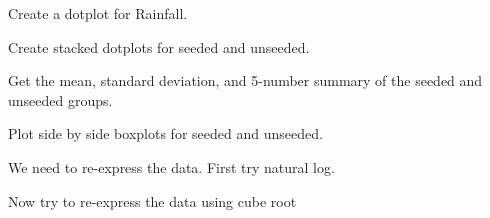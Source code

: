 \documentclass[12pt,letterpaper]{hmcpset}
\begin{document}

\begin{problem}[a]

    Create a dotplot for Rainfall.

\end{problem}

\begin{solution}

\end{solution}

\begin{problem}[b]

    Create stacked dotplots for seeded and unseeded.

\end{problem}

\begin{solution}

\end{solution}

\begin{problem}[c]

    Get the mean, standard deviation, and 5-number summary of the seeded and unseeded groups.

\end{problem}

\begin{solution}

\end{solution}

\begin{problem}[d]

    Plot side by side boxplots for seeded and unseeded.

\end{problem}

\begin{solution}

\end{solution}

\begin{problem}[e]

    We need to re-express the data. First try natural log.

\end{problem}

\begin{solution}

\end{solution}

\begin{problem}[$\text{e}_2$]

     Now try to re-express the data using cube root

\end{problem}
\end{document}
